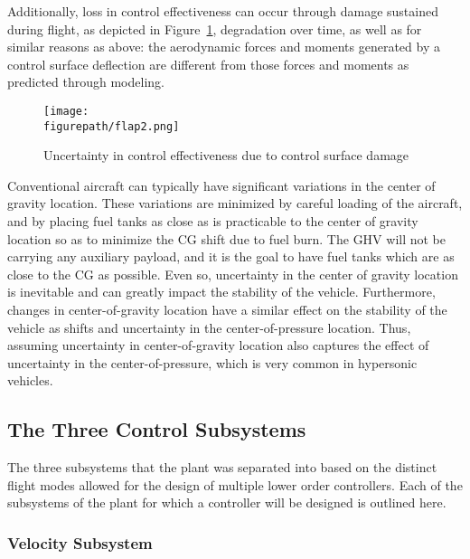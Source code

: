 Additionally, loss in control effectiveness can occur through damage sustained during flight, as depicted in Figure~\ref{fig:flapdamage}, degradation over time, as well as for similar reasons as above: the aerodynamic forces and moments generated by a control surface deflection are different from those forces and moments as predicted through modeling.

\begin{figure}[H]
  \begin{center}
    \texttt{[image: \\figurepath/flap2.png]}
    \caption{Uncertainty in control effectiveness due to control surface damage\label{fig:flapdamage}}
  \end{center}
\end{figure}

Conventional aircraft can typically have significant variations in the center of gravity location.
These variations are minimized by careful loading of the aircraft, and by placing fuel tanks as close as is practicable to the center of gravity location so as to minimize the CG shift due to fuel burn.
The GHV will not be carrying any auxiliary payload, and it is the goal to have fuel tanks which are as close to the CG as possible.
Even so, uncertainty in the center of gravity location is inevitable and can greatly impact the stability of the vehicle.
Furthermore, changes in center-of-gravity location have a similar effect on the stability of the vehicle as shifts and uncertainty in the center-of-pressure location.
Thus, assuming uncertainty in center-of-gravity location also captures the effect of uncertainty in the center-of-pressure, which is very common in hypersonic vehicles.

\subsection{The Three Control Subsystems}

The three subsystems that the plant was separated into based on the distinct flight modes allowed for the design of multiple lower order controllers.
Each of the subsystems of the plant for which a controller will be designed is outlined here.

\subsubsection{Velocity Subsystem}

